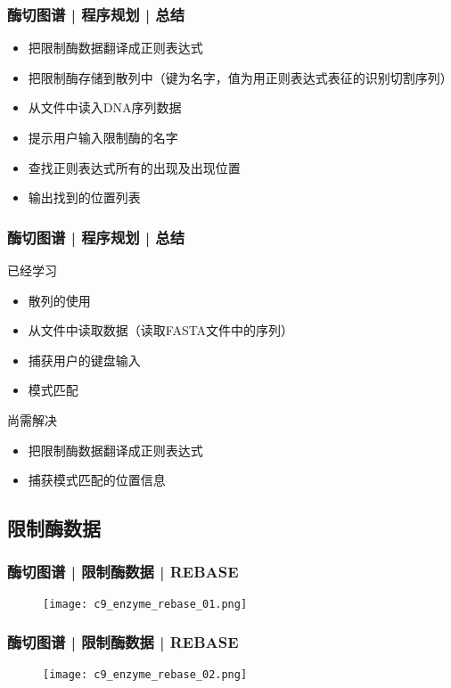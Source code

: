 \begin{frame}
  \frametitle{酶切图谱 | 程序规划 | 总结}
  \begin{itemize}
    \item 把限制酶数据翻译成正则表达式
    \item 把限制酶存储到散列中（键为名字，值为用正则表达式表征的识别切割序列）
    \item 从文件中读入DNA序列数据
    \item 提示用户输入限制酶的名字
    \item 查找正则表达式所有的出现及出现位置
    \item 输出找到的位置列表
  \end{itemize}
\end{frame}

\begin{frame}
  \frametitle{酶切图谱 | 程序规划 | 总结}
  \begin{block}{已经学习}
    \begin{itemize}
      \item 散列的使用
      \item 从文件中读取数据（读取FASTA文件中的序列）
      \item 捕获用户的键盘输入
      \item 模式匹配
    \end{itemize}
  \end{block}
  \pause
  \begin{block}{尚需解决}
    \begin{itemize}
      \item 把限制酶数据翻译成正则表达式
      \item 捕获模式匹配的位置信息
    \end{itemize}
  \end{block}
\end{frame}

\subsection{限制酶数据}
\begin{frame}
  \frametitle{酶切图谱 | 限制酶数据 | REBASE}
  \begin{figure}
    \centering
    \texttt{[image: c9\_enzyme\_rebase\_01.png]}
  \end{figure}
\end{frame}

\begin{frame}
  \frametitle{酶切图谱 | 限制酶数据 | REBASE}
  \begin{figure}
    \centering
    \texttt{[image: c9\_enzyme\_rebase\_02.png]}
  \end{figure}
\end{frame}

